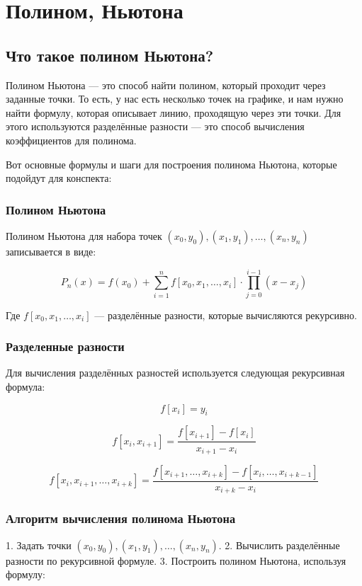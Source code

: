 \documentclass[a4paper,12pt]{article}
\begin{document}
\section{Полином, Ньютона}\label{}
\subsection{Что такое полином Ньютона?}
Полином Ньютона — это способ
найти полином, который проходит через заданные точки. 
То есть, у нас есть несколько точек на графике, и нам нужно найти формулу, которая описывает линию, проходящую через эти точки. Для этого используются разделённые разности — это способ вычисления коэффициентов для полинома.


Вот основные формулы и шаги для построения полинома Ньютона, которые подойдут для конспекта:

\subsubsection{Полином Ньютона}

Полином Ньютона для набора точек \( (x_0, y_0), (x_1, y_1), \dots, (x_n, y_n) \) записывается в виде:

\[
P_n(x) = f(x_0) + \sum_{i=1}^n f[x_0, x_1, \dots, x_i] \cdot \prod_{j=0}^{i-1} (x - x_j)
\]

Где \( f[x_0, x_1, \dots, x_i] \) — разделённые разности, которые вычисляются рекурсивно.

\subsubsection{Разделенные разности}

Для вычисления разделённых разностей используется следующая рекурсивная формула:

\[
f[x_i] = y_i
\]

\[
f[x_i, x_{i+1}] = \frac{f[x_{i+1}] - f[x_i]}{x_{i+1} - x_i}
\]

\[
f[x_i, x_{i+1}, \dots, x_{i+k}] = \frac{f[x_{i+1}, \dots, x_{i+k}] - f[x_i, \dots, x_{i+k-1}]}{x_{i+k} - x_i}
\]

\subsubsection{Алгоритм вычисления полинома Ньютона}

1. Задать точки \( (x_0, y_0), (x_1, y_1), \dots, (x_n, y_n) \).
2. Вычислить разделённые разности по рекурсивной формуле.
3. Построить полином Ньютона, используя формулу:
\end{document}

